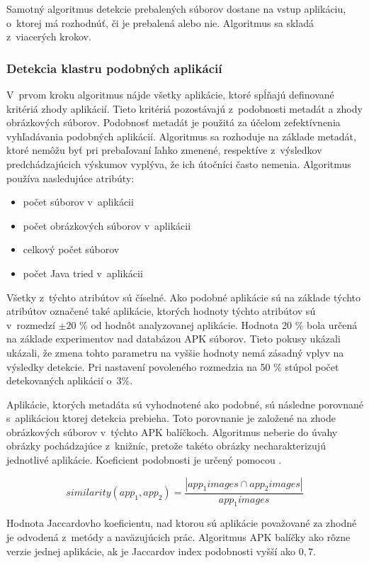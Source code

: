 Samotný algoritmus detekcie prebalených súborov dostane na vstup aplikáciu, o~ktorej má rozhodnúť, či je prebalená alebo nie. Algoritmus sa skladá z~viacerých krokov.

\subsubsection{\textbf{Detekcia klastru podobných aplikácií}} 

V~prvom kroku algoritmus nájde všetky aplikácie, ktoré spĺňajú definované kritériá zhody aplikácií. Tieto kritériá pozostávajú z~podobnosti metadát a zhody obrázkových súborov. 
Podobnosť metadát je použitá za účelom zefektívnenia vyhľadávania podobných aplikácií. Algoritmus sa rozhoduje na základe metadát, ktoré nemôžu byť pri prebaľovaní ľahko zmenené, respektíve z~výsledkov predchádzajúcich výskumov vyplýva, že ich útočníci často nemenia. \newline \noindent Algoritmus používa nasledujúce atribúty:
\begin{itemize}
	\item počet  súborov v~aplikácii
	\item počet obrázkových súborov v~aplikácii
	\item celkový počet súborov
	\item počet Java tried v~aplikácii
\end{itemize}

Všetky z~týchto atribútov sú číselné. Ako podobné aplikácie sú na základe týchto atribútov označené také aplikácie, ktorých hodnoty týchto atribútov sú v~rozmedzí $\pm 20$ \% od hodnôt analyzovanej aplikácie. Hodnota 20 \% bola určená na základe experimentov nad databázou APK súborov. Tieto pokusy ukázali ukázali, že zmena tohto parametru na vyššie hodnoty nemá zásadný vplyv na výsledky detekcie. Pri nastavení povoleného rozmedzia na 50 \% stúpol počet detekovaných aplikácií o~3\%.

Aplikácie, ktorých metadáta sú vyhodnotené ako podobné, sú následne porovnané s~aplikáciou ktorej detekcia prebieha. Toto porovnanie je založené na zhode obrázkových súborov v~týchto APK balíčkoch. Algoritmus neberie do úvahy obrázky pochádzajúce z~knižníc, pretože takéto obrázky necharakterizujú jednotlivé aplikácie.  Koeficient podobnosti je určený pomocou .

\[ similarity(app_1, app_2) = \frac{|app_{1}images \cap app_{2}images|} { app_{1}images} \]

Hodnota Jaccardovho koeficientu, nad ktorou sú aplikácie považované za zhodné je odvodená z~metódy  a naväzujúcich prác. Algoritmus APK balíčky ako rôzne verzie jednej aplikácie, ak je Jaccardov index podobnosti vyšší ako $0,7$.


